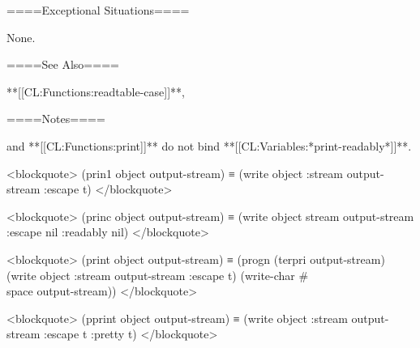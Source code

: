 ====Exceptional Situations====

None.

====See Also====

**[[CL:Functions:readtable-case]]**, {\secref\FORMATPrinterOps}

====Notes====

 and **[[CL:Functions:print]]** do not bind **[[CL:Variables:*print-readably*]]**.

<blockquote> (prin1 object output-stream) ≡ (write object :stream output-stream :escape t) </blockquote>

<blockquote> (princ object output-stream) ≡ (write object stream output-stream :escape nil :readably nil) </blockquote>

<blockquote> (print object output-stream) ≡ (progn (terpri output-stream) (write object :stream output-stream :escape t) (write-char #\\space output-stream)) </blockquote>

<blockquote> (pprint object output-stream) ≡ (write object :stream output-stream :escape t :pretty t) </blockquote>

  
